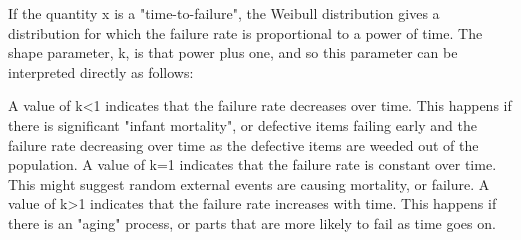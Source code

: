 If the quantity x is a "time-to-failure", the Weibull distribution gives a distribution for which the failure rate is proportional to a power of time. The shape parameter, k, is that power plus one, and so this parameter can be interpreted directly as follows:

A value of k<1 indicates that the failure rate decreases over time. This happens if there is significant "infant mortality", or defective items failing early and the failure rate decreasing over time as the defective items are weeded out of the population.
A value of k=1 indicates that the failure rate is constant over time. This might suggest random external events are causing mortality, or failure.
A value of k>1 indicates that the failure rate increases with time. This happens if there is an "aging" process, or parts that are more likely to fail as time goes on.


